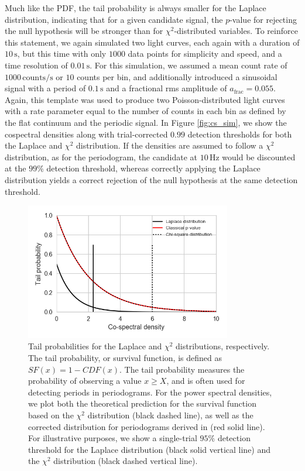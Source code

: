 \documentclass[12pt]{emulateapj}
\begin{document}
\noindent Much like the PDF, the tail probability is always smaller for the Laplace distribution, indicating that for a given candidate signal, the $p$-value for rejecting the null hypothesis will be stronger than for $\chi^2$-distributed variables. To reinforce this statement, we again simulated two light curves, each again with a duration of $10\,\mathrm{s}$, but this time with only $1000$ data points for simplicity and speed, and a time resolution of $0.01\,\mathrm{s}$. For this simulation, we assumed a mean count rate of $1000\,\mathrm{counts/s}$ or $10$ counts per bin, and additionally introduced a sinusoidal signal with a period of $0.1\,\mathrm{s}$ and a fractional rms amplitude of $a_\mathrm{frac} = 0.055$. Again, this template was used to produce two Poisson-distributed light curves with a rate parameter equal to the number of counts in each bin as defined by the flat continuum and the periodic signal. In Figure \ref{fig:cs_sim}, we show the cospectral densities along with trial-corrected $0.99$ detection thresholds for both the Laplace and $\chi^2$ distribution. If the densities are assumed to follow a $\chi^2$ distribution, as for the periodogram, the candidate at $10 \,\mathrm{Hz}$ would be discounted at the $99\%$ detection threshold, whereas correctly applying the Laplace distribution yields a correct rejection of the null hypothesis at the same detection threshold.

\begin{figure}
\begin{center}
\includegraphics[width=9cm]{tailprob.png}
\caption{Tail probabilities for the Laplace and $\chi^2$ distributions, respectively. The tail probability, or survival function, is defined as $SF(x) = 1 - CDF(x)$. The tail probability measures the probability of observing a value $x\geq X$, and is often used for detecting periods in periodograms. For the power spectral densities, we plot both the theoretical prediction for the survival function based on the $\chi^2$ distribution (black dashed line), as well as the corrected distribution for periodograms derived in \citet{groth1975} (red solid line). For illustrative purposes, we show a single-trial $95\%$ detection threshold for the Laplace distribution (black solid vertical line) and the $\chi^2$ distribution (black dashed vertical line).}
\label{fig:survival}
\end{center}
\end{figure}
\end{document}

